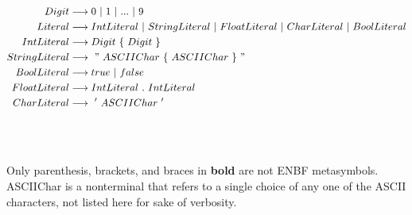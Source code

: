 \documentclass[a4paper,9pt]{extarticle}
\begin{document}
\begin{align*}
Digit &\longrightarrow 0~|~1~|~...~|~9\\
Literal &\longrightarrow IntLiteral~|~StringLiteral~|~FloatLiteral~|~CharLiteral~|~BoolLiteral\\
IntLiteral &\longrightarrow Digit~\lbrace~Digit~\rbrace\\
StringLiteral &\longrightarrow ~"~ASCIIChar~\lbrace~ASCIIChar~\rbrace~"\\
BoolLiteral &\longrightarrow true~|~false\\
FloatLiteral &\longrightarrow IntLiteral~.~IntLiteral\\
CharLiteral &\longrightarrow~'~ASCIIChar~'
\end{align*}
\\\\\\
Only parenthesis, brackets, and braces in \textbf{bold} are not ENBF metasymbols. ASCIIChar is a nonterminal that refers to a single choice of any one of the ASCII characters, not listed here for sake of verbosity.
\end{document}
